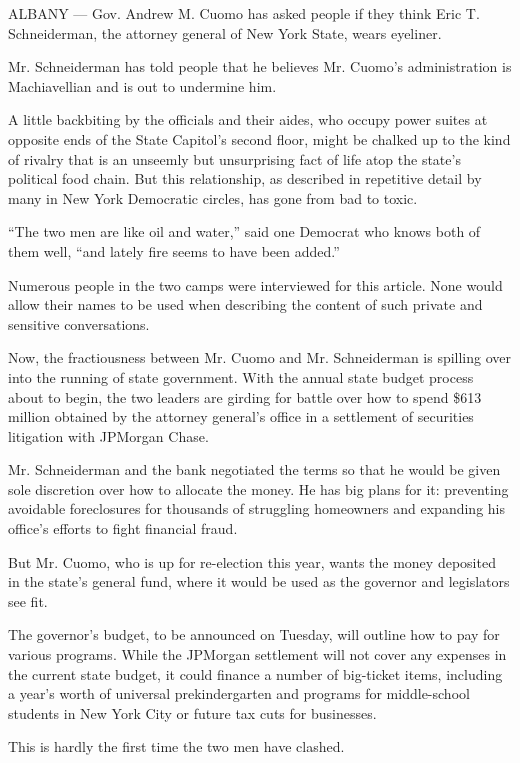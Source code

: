ALBANY --- Gov. Andrew M. Cuomo has asked people if they think Eric T.
Schneiderman, the attorney general of New York State, wears eyeliner.

Mr. Schneiderman has told people that he believes Mr. Cuomo's
administration is Machiavellian and is out to undermine him.

A little backbiting by the officials and their aides, who occupy power
suites at opposite ends of the State Capitol's second floor, might be
chalked up to the kind of rivalry that is an unseemly but unsurprising
fact of life atop the state's political food chain. But this
relationship, as described in repetitive detail by many in New York
Democratic circles, has gone from bad to toxic.

``The two men are like oil and water,'' said one Democrat who knows both
of them well, ``and lately fire seems to have been added.''

Numerous people in the two camps were interviewed for this article. None
would allow their names to be used when describing the content of such
private and sensitive conversations.

Now, the fractiousness between Mr. Cuomo and Mr. Schneiderman is
spilling over into the running of state government. With the annual
state budget process about to begin, the two leaders are girding for
battle over how to spend \$613 million obtained by the attorney
general's office in a settlement of securities litigation with JPMorgan
Chase.

Mr. Schneiderman and the bank negotiated the terms so that he would be
given sole discretion over how to allocate the money. He has big plans
for it: preventing avoidable foreclosures for thousands of struggling
homeowners and expanding his office's efforts to fight financial fraud.

But Mr. Cuomo, who is up for re-election this year, wants the money
deposited in the state's general fund, where it would be used as the
governor and legislators see fit.

The governor's budget, to be announced on Tuesday, will outline how to
pay for various programs. While the JPMorgan settlement will not cover
any expenses in the current state budget, it could finance a number of
big-ticket items, including a year's worth of universal prekindergarten
and programs for middle-school students in New York City or future tax
cuts for businesses.

This is hardly the first time the two men have clashed.

